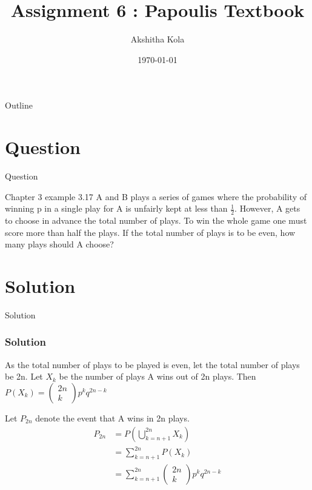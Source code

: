 \documentclass{beamer}
\title{Assignment 6 : Papoulis Textbook }
\author{Akshitha Kola}
\date{\today}
\begin{document}
\begin{frame}
    \titlepage 
\end{frame}

\logo{}

\begin{frame}{Outline}
    \tableofcontents
\end{frame}

\section{Question}
\begin{frame}{Question}
    \begin{block}{Chapter 3 example 3.17}
    A and B plays a series of games where the probability of winning p in a single play for A is unfairly kept at less than $\frac{1}{2}$. However, A gets to choose in advance the total number of plays. To win the whole game one must score more than half the plays. If the total number of plays is to be even, how many plays should A choose?
    \end{block}
\end{frame}

\section{Solution}
\begin{frame}{Solution}
\frametitle{Solution}
As the total number of plays to be played is even, let the total number of plays be 2n. Let $X_{k}$ be the number of plays A wins out of 2n plays.
Then $P(X_{k}) = \begin{pmatrix} 2n\\k\end{pmatrix} p^{k}q^{2n-k}$

Let $P_{2n}$ denote the event that A wins in 2n plays.
\begin{align}
P_{2n} &= P\left(\bigcup\limits_{k=n+1}^{2n} X_{k}\right) \\
&= \sum_{k=n+1}^{2n} P(X_{k})\\
&= \sum_{k=n+1}^{2n} \begin{pmatrix} 2n\\k\end{pmatrix} p^{k}q^{2n-k}
\end{align}
\end{frame}
\end{document}
